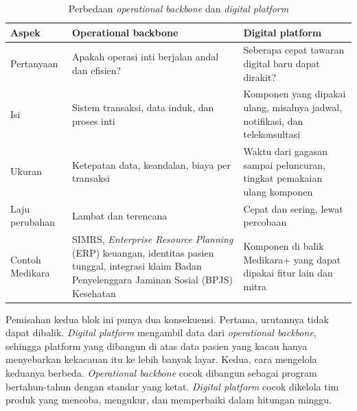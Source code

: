 \begin{table}[!htb]
  \centering
  \caption{Perbedaan \textit{operational backbone} dan \textit{digital platform}}
  \label{tab:ch08-backbone-platform}
  \begin{tabularx}{\textwidth}{l>{\raggedright\arraybackslash}X>{\raggedright\arraybackslash}X}
    \hline
    \textbf{Aspek} & \textbf{Operational backbone} & \textbf{Digital platform} \\
    \hline
    Pertanyaan & Apakah operasi inti berjalan andal dan efisien? &
      Seberapa cepat tawaran digital baru dapat dirakit? \\
    \hline
    Isi & Sistem transaksi, data induk, dan proses inti & Komponen yang dipakai ulang,
      misalnya jadwal, notifikasi, dan telekonsultasi \\
    \hline
    Ukuran & Ketepatan data, keandalan, biaya per transaksi & Waktu dari gagasan sampai
      peluncuran, tingkat pemakaian ulang komponen \\
    \hline
    Laju perubahan & Lambat dan terencana & Cepat dan sering, lewat percobaan \\
    \hline
    Contoh Medikara & SIMRS, \textit{Enterprise Resource Planning} (ERP) keuangan,
      identitas pasien tunggal, integrasi klaim Badan Penyelenggara Jaminan Sosial (BPJS)
      Kesehatan & Komponen di balik Medikara+ yang dapat dipakai fitur lain dan mitra \\
    \hline
  \end{tabularx}
\end{table}

Pemisahan kedua blok ini punya dua konsekuensi.
Pertama, urutannya tidak dapat dibalik. \textit{Digital platform} mengambil data dari
\textit{operational backbone}, sehingga platform yang dibangun di atas data pasien yang
kacau hanya menyebarkan kekacauan itu ke lebih banyak layar. Kedua, cara mengelola keduanya
berbeda. \textit{Operational backbone} cocok dibangun sebagai program bertahun-tahun dengan
standar yang ketat. \textit{Digital platform} cocok dikelola tim produk yang mencoba,
mengukur, dan memperbaiki dalam hitungan minggu.

